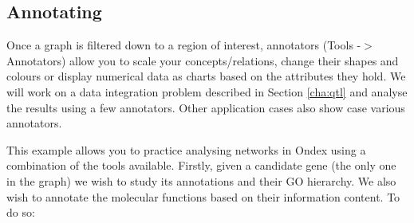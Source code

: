 \subsection{Annotating}
\label{sec:annotating}
Once a graph is filtered down to a region of interest, annotators (Tools -$>$ Annotators) allow you to scale your concepts/relations,
change their shapes and colours or display numerical data as charts based on the attributes they hold.
We will work on a data integration problem described in Section \ref{cha:qtl} and analyse the results using a few annotators. Other application cases also show case various annotators.

This example allows you to practice analysing networks in Ondex using a combination of the tools available.
Firstly, given a candidate gene (the only one in the graph) we wish to study its annotations and their GO hierarchy.
We also wish to annotate the molecular functions based on their information content.
To do so:

